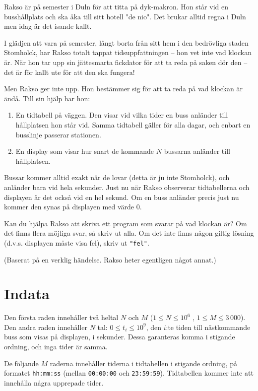 Rakso är på semester i Duln för att titta på dyk-makron. Hon står vid en busshållplats och ska åka till sitt hotell "de nio". Det brukar alltid regna i Duln men idag är det isande kallt.

I glädjen att vara på semester, långt borta från sitt hem i den bedrövliga staden Stomholck, har Rakso totalt tappat tidsuppfattningen -- hon vet inte vad klockan är. När hon tar upp sin jättesmarta fickdator för att ta reda på saken dör den -- det är för kallt ute för att den ska fungera!

Men Rakso ger inte upp. Hon bestämmer sig för att ta reda på vad klockan är ändå. Till sin hjälp har hon:
\begin{enumerate}
  \item En tidtabell på väggen. Den visar vid vilka tider en buss anländer till hållplatsen hon står vid.
    Samma tidtabell gäller för alla dagar, och enbart en busslinje passerar stationen.
  \item En display som visar hur snart de kommande $N$ bussarna anländer till hållplatsen.
\end{enumerate}
Bussar kommer alltid exakt när de lovar (detta är ju inte Stomholck), och anländer bara vid hela sekunder. Just nu när Rakso observerar tidtabellerna och displayen är det också vid en hel sekund. Om en buss anländer precis just nu kommer den synas på displayen med värde $0$.

Kan du hjälpa Rakso att skriva ett program som svarar på vad klockan är? Om det finns flera möjliga svar, så skriv ut alla.
Om det inte finns någon giltig lösning (d.v.s. displayen måste visa fel), skriv ut \texttt{"fel"}.

(Baserat på en verklig händelse. Rakso heter egentligen något annat.)

\section*{Indata}
Den första raden innehåller två heltal $N$ och $M$ ($1 \leq N \leq 10^6$ , $1 \leq M \leq 3\,000$).
Den andra raden innehåller $N$ tal: $0 \le t_i \le 10^9$, den $i$:te tiden till nästkommande buss som visas på displayen, i sekunder.
Dessa garanteras komma i stigande ordning, och inga tider är samma.

De följande $M$ raderna innehåller tiderna i tidtabellen i stigande ordning, på formatet \texttt{hh:mm:ss} (mellan \texttt{00:00:00} och \texttt{23:59:59}).
Tidtabellen kommer inte att innehålla några upprepade tider.

